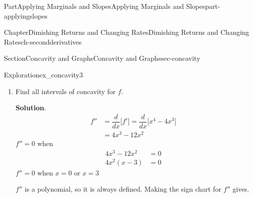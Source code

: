 \documentclass{tufte-book}
\newcommand{\blocktitlefont}{\relax}
\numberwithin{equation}{chapter}
\newcommand{\ddx}[1]{ \dfrac{d}{dx} \Big[ #1 \Big]  }
\newcommand{\amp}{&}
\begin{document}
\begin{partptx}{Part}{Applying Marginals and Slopes}{}{Applying Marginals and Slopes}{}{}{part-applyingslopes}
\begin{chapterptx}{Chapter}{Dimishing Returns and Changing Rates}{}{Dimishing Returns and Changing Rates}{}{}{ch-secondderivatives}
\begin{sectionptx}{Section}{Concavity and Graphs}{}{Concavity and Graphs}{}{}{sec-concavity}
\begin{exploration}{Exploration}{}{ex_concavity3}
\begin{enumerate}[font=\bfseries,label=(\alph*),ref=\alph*]
\begin{image}{0.25}{0.5}{0.25}{}
{
}%
\end{image}%
 \(f\) has a local maximum at \(x=0\), and a local mininmum at \(x=4\).%
\item{}Find all intervals of concavity for \(f\).%
\par\smallskip%
\noindent\textbf{\blocktitlefont Solution}.\hypertarget{ex_concavity3-3-2}{}\quad{}%
\begin{align*}
f'' \amp = \ddx{f'} = \ddx{x^4 - 4x^3} \\
\amp = 4x^3-12x^2
\end{align*}
\(f''=0\) when%
\begin{align*}
4x^3 -12x^2 \amp = 0\\
4x^2( x - 3)\amp = 0 
\end{align*}
\(f''=0\) when \(x=0\) or \(x=3\)%
\par
\(f''\) is a polynomial, so it is always defined.  Making the sign chart for \(f''\) gives. \begin{image}{0.25}{0.5}{0.25}{}%
%
\end{image}%

\end{enumerate}
\end{exploration}
\end{sectionptx}
\end{chapterptx}
\end{partptx}
\end{document}
